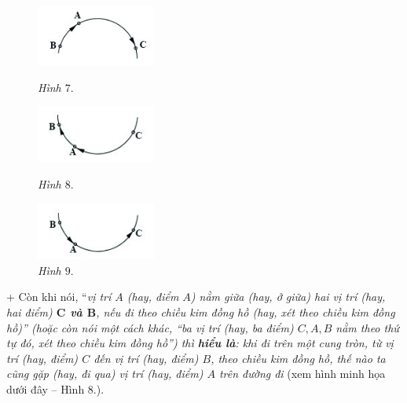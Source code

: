 \vskip 0.1cm
		\begin{figure}
		\vspace*{-15pt}
		\centering
		\captionsetup{labelformat=empty, justification=centering}
		\hspace*{-10pt}\includegraphics[width= 0.35\textwidth]{pic7}
		\caption{\textit{\small Hình $7.$}}
		
		\vspace*{10pt}
		\hspace*{-10pt}\includegraphics[width=0.35\textwidth]{pic8}
		\caption{\small\textit{Hình $8.$}}
		
		\vspace*{10pt}
		\captionsetup{labelformat=empty, justification=centering}
		\hspace*{-10pt}\includegraphics[width= 0.35\textwidth]{pic9}
		\caption{\textit{\small Hình $9.$}}
		
		\vspace*{-20pt}
	\end{figure}
	+ Còn khi nói, “\textit{vị trí $A$ (\textnormal{hay}, điểm $A$) nằm giữa (\textnormal{hay}, ở giữa) hai vị trí (\textnormal{hay}, hai điểm) \textbf{\color{toancuabi}$\pmb C$ và $\pmb B$}, nếu đi theo chiều kim đồng hồ (\textnormal{hay}, xét theo chiều kim đồng hồ)” (\textnormal{hoặc còn} nói một cách khác, “ba vị trí (\textnormal{hay}, ba điểm) $C, A, B$ nằm theo thứ tự đó, xét theo chiều kim đồng hồ”) thì \textbf{\color{toancuabi}hiểu là}: khi đi trên một cung tròn, từ vị trí (\textnormal{hay}, điểm) $C$ đến vị trí (\textnormal{hay}, điểm) $B$, theo chiều kim đồng hồ, thế nào ta cũng gặp (\textnormal{hay}, đi qua) vị trí (\textnormal{hay}, điểm) $A$ trên đường đi} (xem hình minh họa dưới đây -- Hình $8.$).
